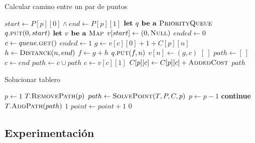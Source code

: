 \documentclass[letter,12pt]{article}
\begin{document}
\begin{algorithm}[ht!]
\caption{Calcular camino entre un par de puntos}
\begin{algorithmic}[1] 
    \State $start \leftarrow P[p][0] \land end \leftarrow P[p][1]$
    \State $\textbf{let } q \textbf{ be a } \textsc{PriorityQueue}$
    \State $q.\Call{put}{0, start}$
    \State $\textbf{let } v \textbf{ be a } \textsc{Map}$
    \State $v[start] \leftarrow (0, \textsc{Null})$
    \State $ended \leftarrow 0$
        \State $c \leftarrow queue.\Call{get}$
            \State $ended \leftarrow 1$
        \EndIf
            \State $g \leftarrow v[c][0] + 1 + C[p][n]$
            \State $h \leftarrow \Call{Distance}{n, end}$
            \State $f \leftarrow g + h$
                \State $q.\Call{put}{f, n}$
                \State $v[n] \leftarrow (g, c)$
            \EndIf
        \EndFor
    \EndWhile
        \State \Return $[~]$
    \EndIf
    \State $path \leftarrow [~]$
    \State $c \leftarrow end$
        \State $path \leftarrow c \cup path$
        \State $c \leftarrow v[c][1]$
        \State $C[p][c] \leftarrow C[p][c] + \textsc{AddedCost}$
    \EndWhile
    \State \Return $path$
\EndProcedure
\end{algorithmic}
\end{algorithm}

\newpage

\begin{algorithm}[ht!]
\caption{Solucionar tablero}
\begin{algorithmic}[1] 
    \State $p \leftarrow 1$
        \State $T.\Call{RemovePath}{p}$
        \State $path \leftarrow \Call{SolvePoint}{T, P, C, p}$
            \State $p \leftarrow p - 1$
            \State \textbf{continue}
        \EndIf
        \State $T.\Call{AddPath}{path}$
            \State \Return $1$
        \EndIf
        \State $point \leftarrow point + 1$
    \EndWhile
    \State \Return $0$
\EndProcedure
\end{algorithmic}
\end{algorithm}

\subsection{Experimentación} \label{analisis:experimentacion}
\end{document}
